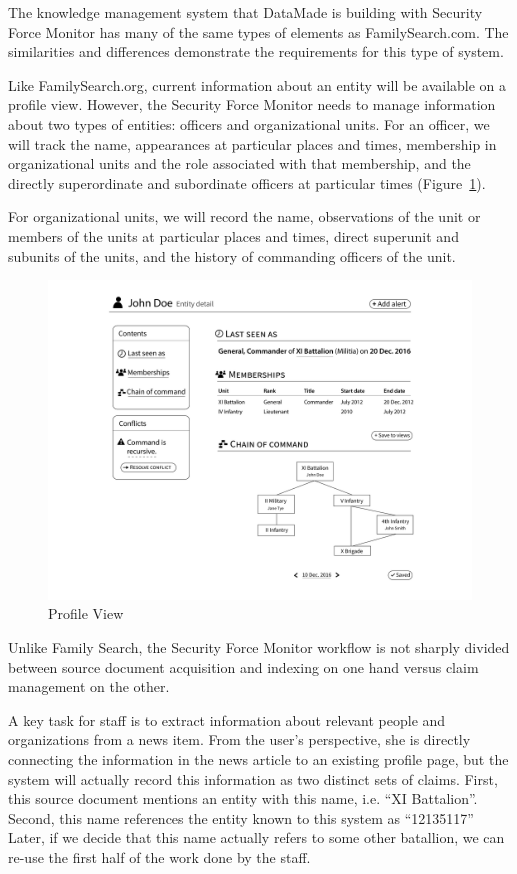 \documentclass[format=siggraph, review=true]{acmart}
\begin{document}
The knowledge management system that DataMade is building with
Security Force Monitor has many of the same types of elements as
FamilySearch.com. The similarities and differences demonstrate the
requirements for this type of system.

Like FamilySearch.org, current information about an entity will be
available on a profile view. However, the Security Force Monitor needs to
manage information about two types of entities: officers and
organizational units. For an officer, we will track the name,
appearances at particular places and times, membership in
organizational units and the role associated with that membership, and
the directly superordinate and subordinate officers at particular
times (Figure~\ref{fig:entity-detail}).

For organizational units, we will record the name, observations of the
unit or members of the units at particular places and times, direct
superunit and subunits of the units, and the history of commanding
officers of the unit.

\begin{figure}[h]
\includegraphics[width=\columnwidth]{images/sketches/entity-detail.png}
\caption{Profile View}
\label{fig:entity-detail}
\end{figure}

Unlike Family Search, the Security Force Monitor workflow is
not sharply divided between source document acquisition and indexing
on one hand versus claim management on the other.

A key task for staff is to extract information about relevant
people and organizations from a news item. From the user's
perspective, she is directly connecting the information in the news
article to an existing profile page, but the system will actually record
this information as two distinct sets of claims. First, this source
document mentions an entity with this name, i.e. ``XI
Battalion''. Second, this name references the entity known to this
system as ``12135117'' Later, if we decide that this name actually
refers to some other batallion, we can re-use the first half of the
work done by the staff.
\end{document}
